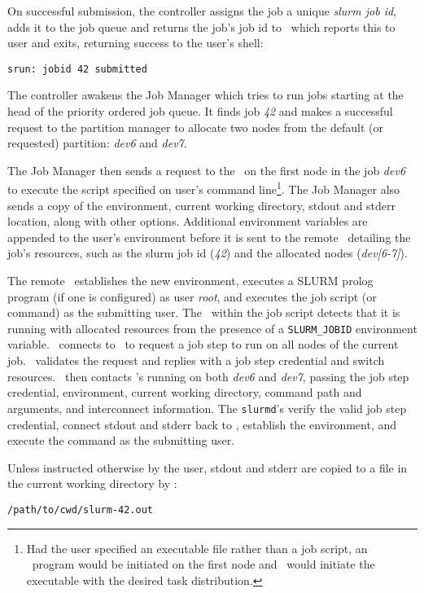 \documentclass[10pt,onecolumn,times]{../common/llncs}
\begin{document}
{On successful submission, the controller assigns the job a unique 
{\em slurm job id}, adds it to the job queue and returns the job's
job id to \srun\, which reports this to user and exits, returning
success to the user's shell:

\begin{verbatim}
srun: jobid 42 submitted
\end{verbatim}

The controller awakens the Job Manager which tries to run jobs starting
at the head of the priority ordered job queue.  It finds job {\em 42} and
makes a successful request to the partition manager to allocate two nodes
from the default (or requested) partition: {\em dev6} and {\em dev7}.

The Job Manager then sends a request to the \slurmd\ on the first
node in the job {\em dev6} to execute the script specified on user's
command line\footnote{Had the user specified an executable file rather
than a job script, an \srun\ program would be initiated on the first
node and \srun\ would initiate the executable with the desired task
distribution.}.  The Job Manager also sends a copy of the environment,
current working directory, stdout and stderr location, along with other
options. Additional environment variables are appended to the user's
environment before it is sent to the remote \slurmd\ detailing the job's
resources, such as the slurm job id ({\em 42}) and the allocated nodes
({\em dev[6-7]}).

The remote \slurmd\ establishes the new environment, executes a SLURM
prolog program (if one is configured) as user {\em root}, and executes
the job script (or command) as the submitting user. The \srun\ within
the job script detects that it is running with allocated resources from
the presence of a {\tt SLURM\_JOBID} environment variable. \srun\
connects to \slurmctld\ to request a job step to run on all nodes of
the current job. \slurmctld\ validates the request and replies with a
job step credential and switch resources. \srun\ then contacts \slurmd 's
running on both {\em dev6} and {\em dev7}, passing the job step credential,
environment, current working directory, command path and arguments,
and interconnect information. The {\tt slurmd}'s verify the valid job
step credential, connect stdout and stderr back to \srun , establish
the environment, and execute the command as the submitting user.

Unless instructed otherwise by the user, stdout and stderr are
copied to a file in the current working directory by \srun :
\begin{verbatim}
/path/to/cwd/slurm-42.out
\end{verbatim}

}
\end{document}
